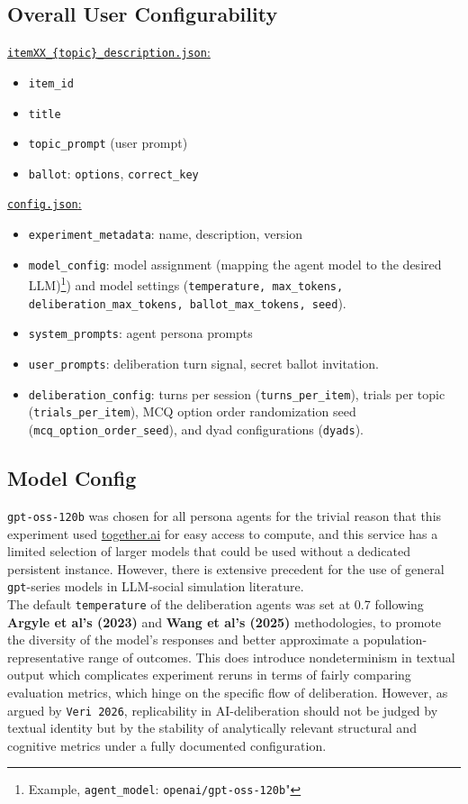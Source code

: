 \documentclass[titlepage]{article}
\begin{document}
\subsection{Overall User Configurability}

\underline{\texttt{itemXX\_\{topic\}\_description.json}:}
\begin{itemize}
    \item \texttt{item\_id}
    \item \texttt{title}
    \item \texttt{topic\_prompt} (user prompt)
    \item \texttt{ballot}: \texttt{options}, \texttt{correct\_key}
\end{itemize}

\underline{\texttt{config.json}:}
\begin{itemize}
    \item \texttt{experiment\_metadata}: name, description, version
    \item \texttt{model\_config}: model assignment (mapping the agent model to the desired LLM)\footnote{Example, \texttt{agent\_model}: \texttt{openai/gpt-oss-120b}"}) and model settings (\texttt{temperature, max\_tokens, deliberation\_max\_tokens, ballot\_max\_tokens, seed}).
    \item \texttt{system\_prompts}: agent persona prompts
    \item \texttt{user\_prompts}: deliberation turn signal, secret ballot invitation.
    \item \texttt{deliberation\_config}: turns per session (\texttt{turns\_per\_item}), trials per topic (\texttt{trials\_per\_item}), MCQ option order randomization seed (\texttt{mcq\_option\_order\_seed}), and dyad configurations (\texttt{dyads}).
\end{itemize}

\subsection{Model Config}
\texttt{gpt-oss-120b} was chosen for all persona agents for the trivial reason that this experiment used \href{https://www.together.ai/}{together.ai} for easy access to compute, and this service has a limited selection of larger models that could be used without a dedicated persistent instance. However, there is extensive precedent for the use of general \texttt{gpt}-series models in LLM-social simulation literature.\\

The default \texttt{temperature} of the deliberation agents was set at 0.7 following \textbf{Argyle et al's (2023)} and \textbf{Wang et al's (2025)} methodologies, to promote the diversity of the model's responses and better approximate a population-representative range of outcomes. This does introduce nondeterminism in textual output which complicates experiment reruns in terms of fairly comparing evaluation metrics, which hinge on the specific flow of deliberation. However, as argued by \texttt{Veri 2026}, replicability in AI-deliberation should not be judged by textual identity but by the stability of analytically relevant structural and cognitive metrics under a fully documented configuration. \\
\end{document}
